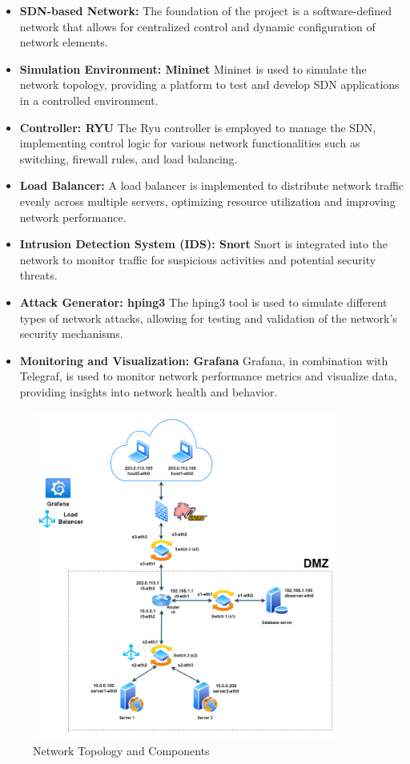 \documentclass[a4paper,12pt]{article}
\begin{document}
\begin{itemize}
    \item \textbf{SDN-based Network:} The foundation of the project is a software-defined network that allows for centralized control and dynamic configuration of network elements.
    \item \textbf{Simulation Environment: Mininet} Mininet is used to simulate the network topology, providing a platform to test and develop SDN applications in a controlled environment.
    \item \textbf{Controller: RYU} The Ryu controller is employed to manage the SDN, implementing control logic for various network functionalities such as switching, firewall rules, and load balancing.
    \item \textbf{Load Balancer:} A load balancer is implemented to distribute network traffic evenly across multiple servers, optimizing resource utilization and improving network performance.
    \item \textbf{Intrusion Detection System (IDS): Snort} Snort is integrated into the network to monitor traffic for suspicious activities and potential security threats.
    \item \textbf{Attack Generator: hping3} The hping3 tool is used to simulate different types of network attacks, allowing for testing and validation of the network's security mechanisms.
    \item \textbf{Monitoring and Visualization: Grafana} Grafana, in combination with Telegraf, is used to monitor network performance metrics and visualize data, providing insights into network health and behavior.
\end{itemize}

\begin{figure}[h]
    \centering
    \includegraphics[width=0.9\textwidth]{1.png}
    \caption{Network Topology and Components}
    \label{fig:network_topology}
\end{figure}
\end{document}
